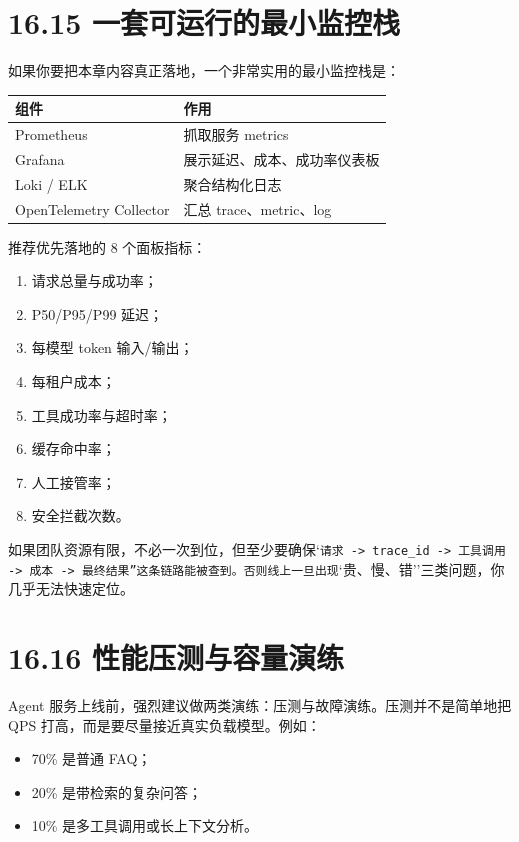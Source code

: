 \section{16.15 一套可运行的最小监控栈}

如果你要把本章内容真正落地，一个非常实用的最小监控栈是：


\begingroup
\scriptsize
\setlength{\tabcolsep}{3pt}
\begin{longtable}{|p{}|p{}|}
\hline
组件 & 作用 \\ \hline
Prometheus & 抓取服务 metrics \\ \hline
Grafana & 展示延迟、成本、成功率仪表板 \\ \hline
Loki / ELK & 聚合结构化日志 \\ \hline
OpenTelemetry Collector & 汇总 trace、metric、log \\ \hline
\end{longtable}
\endgroup

推荐优先落地的 8 个面板指标：


\begin{enumerate}[leftmargin=2em]
\item 请求总量与成功率；
\item P50/P95/P99 延迟；
\item 每模型 token 输入/输出；
\item 每租户成本；
\item 工具成功率与超时率；
\item 缓存命中率；
\item 人工接管率；
\item 安全拦截次数。
\end{enumerate}

如果团队资源有限，不必一次到位，但至少要确保`\texttt{请求 -> trace\_id -> 工具调用 -> 成本 -> 最终结果''这条链路能被查到。否则线上一旦出现}`贵、慢、错''三类问题，你几乎无法快速定位。


\section{16.16 性能压测与容量演练}

Agent 服务上线前，强烈建议做两类演练：压测与故障演练。压测并不是简单地把 QPS 打高，而是要尽量接近真实负载模型。例如：


\begin{itemize}[leftmargin=2em]
\item 70\% 是普通 FAQ；
\item 20\% 是带检索的复杂问答；
\item 10\% 是多工具调用或长上下文分析。
\end{itemize}

